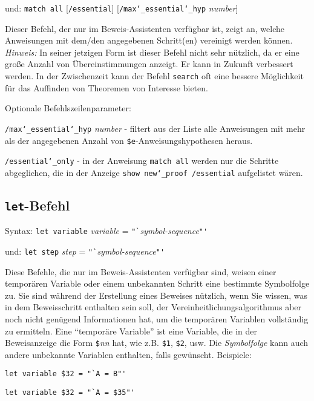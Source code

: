    und:  \texttt{match all} [\texttt{/essential}]
          [\texttt{/max{\char`\_}essential{\char`\_}hyp} {\em number}]

Dieser Befehl, der nur im Beweis-Assistenten verfügbar ist, zeigt an, welche Anweisungen mit dem/den angegebenen Schritt(en) vereinigt werden können.  {\em Hinweis:} In seiner jetzigen Form ist dieser Befehl nicht sehr nützlich, da er eine große Anzahl von Übereinstimmungen anzeigt. Er kann in Zukunft verbessert werden.  In der Zwischenzeit kann der Befehl \texttt{search} oft eine bessere Möglichkeit für das Auffinden von Theoremen von Interesse bieten. 

Optionale Befehlszeilenparameter:

    \texttt{/max{\char`\_}essential{\char`\_}hyp} {\em number} - filtert aus der Liste alle Anweisungen mit mehr als der angegebenen Anzahl von \texttt{\$e}-Anweisungshypothesen heraus.

    \texttt{/essential{\char`\_}only} - in der Anweisung \texttt{match all} werden nur die Schritte abgeglichen, die in der Anzeige \texttt{show new{\char`\_}proof /essential} aufgelistet wären.


\subsection{\texttt{let}-Befehl}

Syntax: \texttt{let variable} {\em variable} = \verb/"`/{\em symbol-sequence}\verb/"'/

  und: \texttt{let step} {\em step} = \verb/"`/{\em symbol-sequence}\verb/"'/

Diese Befehle, die nur im Beweis-Assistenten verfügbar sind, weisen einer temporären Variable oder einem unbekannten Schritt eine bestimmte Symbolfolge zu.  Sie sind während der Erstellung eines Beweises nützlich, wenn Sie wissen, was in dem Beweisschritt enthalten sein soll, der Vereinheitlichungsalgorithmus aber noch nicht genügend Informationen hat, um die temporären Variablen vollständig zu ermitteln.  Eine "`temporäre Variable"' ist eine Variable, die in der Beweisanzeige die Form \texttt{\$}{\em nn} hat, wie z.B. \texttt{\$1}, \texttt{\$2}, usw.  Die {\em Symbolfolge} kann auch andere unbekannte Variablen enthalten, falls gewünscht.  Beispiele: 

    \verb/let variable $32 = "`A = B"'/

    \verb/let variable $32 = "`A = $35"'/


